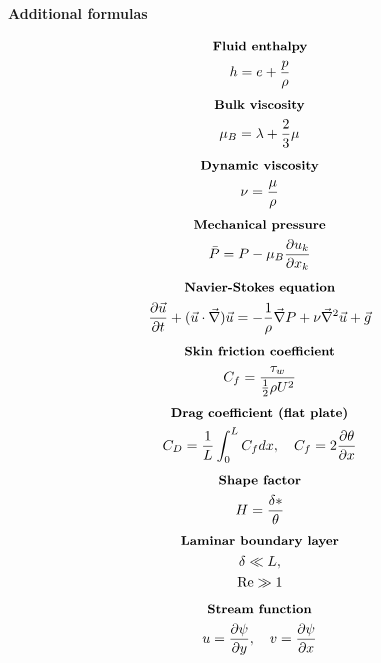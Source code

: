 \documentclass[10pt, a4paper]{article}
\newcommand{\derivative}[2]{\frac{\partial #1}{\partial #2}}
\begin{document}
\begin{center}
    \Large
    \textbf{Additional formulas}
    \vspace{0.5cm}
\end{center}
\begin{multicols*}{2}
    \begin{gather*}
        \textbf{\small Fluid enthalpy} \\
        h = e + \frac{p}{\rho}
    \end{gather*}
    \begin{gather*}
        \textbf{\small Bulk viscosity} \\
        \mu_B = \lambda + \frac23 \mu
    \end{gather*}
    \begin{gather*}
        \textbf{\small Dynamic viscosity} \\
        \nu = \frac{\mu}{\rho}
    \end{gather*}
    \begin{gather*}
        \textbf{\small Mechanical pressure} \\
        \bar{P} = P - \mu_B\derivative{u_k}{x_k}
    \end{gather*}
    \begin{gather*}
        \textbf{\small Navier-Stokes equation} \\
        \derivative{ \vec{u}}{t} + (\vec{u}\cdot \vec{\nabla})\vec{u} =
        -\frac{1}{\rho}\vec{\nabla}P + \nu \vec{\nabla}^2 \vec{u} + \vec{g}
    \end{gather*}
    \begin{gather*}
        \textbf{\small Skin friction coefficient} \\
        C_f = \frac{\tau_w}{\frac12 \rho U^2}
    \end{gather*}
    \begin{gather*}
        \textbf{\small Drag coefficient (flat plate)} \\
        C_D = \frac{1}{L}\int_0^L C_f dx, \quad C_f = 2\derivative{ \theta}{x}
    \end{gather*}
    \begin{gather*}
        \textbf{\small Shape factor} \\
        H = \frac{\delta *}{\theta}
    \end{gather*}
    \begin{gather*}
        \textbf{\small Laminar boundary layer} \\
        \delta \ll L, \\
        \text{Re} \gg 1
    \end{gather*}
    \begin{gather*}
        \textbf{\small Stream function} \\
        u = \derivative{\psi}{y}, \quad v = \derivative{\psi}{x}
    \end{gather*}
\end{multicols*}
\end{document}
